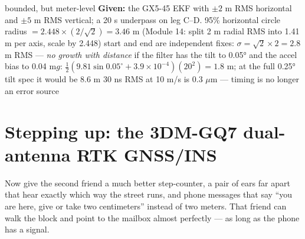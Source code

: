 \begin{worked}{bounded, but meter-level}
\textbf{Given:} the GX5-45 EKF with $\pm2$ m RMS horizontal and $\pm5$ m RMS vertical; a 20 s underpass on leg C--D.
 95\% horizontal circle radius $=2.448\times(2/\sqrt2)=3.46$ m (Module 14: split 2 m radial RMS into 1.41 m per axis, scale by 2.448)
 start and end are independent fixes: $\sigma=\sqrt{2}\times2=2.8$ m RMS --- \emph{no growth with distance}
 if the filter has the tilt to 0.05° and the accel bias to 0.04 m$g$: $\tfrac12(9.81\sin0.05^\circ+3.9\times10^{-4})(20^2)=1.8$ m; at the full 0.25° tilt spec it would be 8.6 m
 30 ns RMS at 10 m/s is 0.3 $\mu$m --- timing is no longer an error source
\end{worked}

\section{Stepping up: the 3DM-GQ7 dual-antenna RTK GNSS/INS}
\begin{kid}
Now give the second friend a much better step-counter, a pair of ears far apart that hear exactly which way the street runs, and phone messages that say ``you are here, give or take two centimeters'' instead of two meters. That friend can walk the block and point to the mailbox almost perfectly --- as long as the phone has a signal.
\end{kid}

